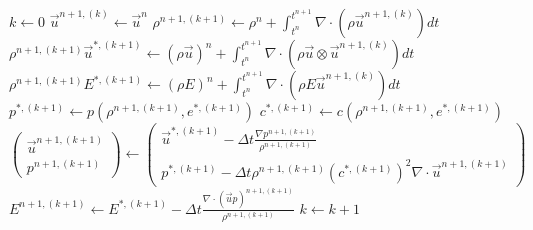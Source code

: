 \documentclass[]{article}
\begin{document}
\begin{algorithm}
\caption{Asymptotically Preserving time discretization for gas dynamics\label{asym_preserve}}
\begin{algorithmic}[1] %
\State $k \gets 0$
\State $\vec{u}^{n+1,(k)} \gets \vec{u}^{n}$
 \State $\rho^{n+1,(k+1)}\gets \rho^{n}+\int_{t^{n}}^{t^{n+1}}\nabla\cdot(\rho\vec{u}^{n+1,(k)})dt$ 
 \State $\rho^{n+1,(k+1)}\vec{u}^{\ast,(k+1)}\gets (\rho\vec{u})^{n}+\int_{t^{n}}^{t^{n+1}}\nabla\cdot(\rho\vec{u}\otimes\vec{u}^{n+1,(k)})dt$
 \State $\rho^{n+1,(k+1)}E^{\ast,(k+1)}\gets (\rho E)^{n}+\int_{t^{n}}^{t^{n+1}}\nabla\cdot(\rho E \vec{u}^{n+1,(k)})dt$
 \State $p^{\ast,(k+1)}\gets p(\rho^{n+1,(k+1)},e^{\ast,(k+1)})$
 \State $c^{\ast,(k+1)}\gets c(\rho^{n+1,(k+1)},e^{\ast,(k+1)})$
 \State $\left( \begin{array}{c} \vec{u}^{n+1,(k+1)} \\ 
           p^{n+1,(k+1)} \end{array}\right)\gets
  \left( \begin{array}{c} 
    \vec{u}^{\ast,(k+1)}-\Delta t\frac{\nabla p^{n+1,(k+1)}}{\rho^{n+1,(k+1)}} \\
  p^{\ast,(k+1)}-\Delta t \rho^{n+1,(k+1)} (c^{\ast,(k+1)})^{2} \nabla\cdot\vec{u}^{n+1,(k+1)}\end{array}\right)$
 \State $E^{n+1,(k+1)}\gets E^{\ast,(k+1)}-
	\Delta t\frac{\nabla\cdot(\vec{u}p)^{n+1,(k+1)}}{\rho^{n+1,(k+1)}}$
 \State $k \gets k+1$
\EndWhile
\end{algorithmic}
\end{algorithm}
\end{document}
